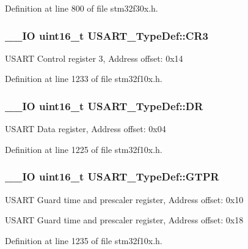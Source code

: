 Definition at line 800 of file stm32f30x.\-h.

\hypertarget{struct_u_s_a_r_t___type_def_a2b9d1df38cb1d745305c8190a8707a0f}{
\subsubsection[{C\-R3}]{\setlength{\rightskip}{0pt plus 5cm}\-\_\-\-\_\-\-I\-O {\bf uint16\-\_\-t} U\-S\-A\-R\-T\-\_\-\-Type\-Def\-::\-C\-R3}}\label{struct_u_s_a_r_t___type_def_a2b9d1df38cb1d745305c8190a8707a0f}
U\-S\-A\-R\-T Control register 3, Address offset\-: 0x14 

Definition at line 1233 of file stm32f10x.\-h.

\hypertarget{struct_u_s_a_r_t___type_def_accee34aaec89aad4aeef512bba173ae5}{
\subsubsection[{D\-R}]{\setlength{\rightskip}{0pt plus 5cm}\-\_\-\-\_\-\-I\-O {\bf uint16\-\_\-t} U\-S\-A\-R\-T\-\_\-\-Type\-Def\-::\-D\-R}}\label{struct_u_s_a_r_t___type_def_accee34aaec89aad4aeef512bba173ae5}
U\-S\-A\-R\-T Data register, Address offset\-: 0x04 

Definition at line 1225 of file stm32f10x.\-h.

\hypertarget{struct_u_s_a_r_t___type_def_abe51502097b1fd281d0a2a1b157d769e}{
\subsubsection[{G\-T\-P\-R}]{\setlength{\rightskip}{0pt plus 5cm}\-\_\-\-\_\-\-I\-O {\bf uint16\-\_\-t} U\-S\-A\-R\-T\-\_\-\-Type\-Def\-::\-G\-T\-P\-R}}\label{struct_u_s_a_r_t___type_def_abe51502097b1fd281d0a2a1b157d769e}
U\-S\-A\-R\-T Guard time and prescaler register, Address offset\-: 0x10

U\-S\-A\-R\-T Guard time and prescaler register, Address offset\-: 0x18 

Definition at line 1235 of file stm32f10x.\-h.

